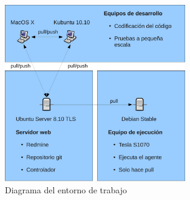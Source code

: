 \begin{figure}
	\centering
	\includegraphics[width=0.7\textwidth]{images/entorno_trabajo.pdf}
	\caption{Diagrama del entorno de trabajo}\label{fig:entorno_trabajo}
\end{figure}




